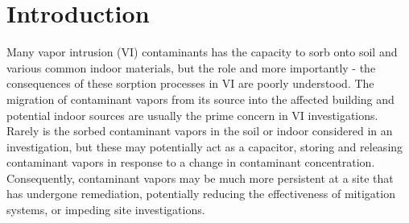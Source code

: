 \begin{comment}

What is the message of the paper?

Sorbed contaminants can significantly delay changes in concentration in the indoor air and the soil-gas depending on the particular soil and/or indoor materials found.
This has consequences if one is for instance interested in mitigating or remediating a VI site as sorption may significantly impede this effort.
It also has consequences for rooting out indoor contaminant sources as:
1. Even after ventilation and/or removing potential indoor sources, there may still be contaminant vapors being released from various materials.
2. It may decrease the effectiveness of applying the CPM.

What is the new result/contribution that you want to describe?

This study presents some new sorption information for TCE and runs never-done-before simulations that investigate the potential role of sorption in VI and VI investigations.

What do you want to convince people of?

1. Take indoor materials into account and perhaps removing or covering up exposed materials that have a high sorption capacity.
2. Take it into consideration that contaminants vapors may emanate from soils for a long time, since they potentially have such a large sorption capacity - almost acting a source in of themselves. E.g. that remediation or mitigation effort may be impeded by this.
3. Perhaps desorbing soil/indoor material samples to determine how significant sorption might be warranted.

\end{comment}

\section{Introduction}\label{sec:intro}

Many vapor intrusion (VI) contaminants has the capacity to sorb onto soil and various common indoor materials, but the role and more importantly - the consequences of these sorption processes in VI are poorly understood.
The migration of contaminant vapors from its source into the affected building and potential indoor sources are usually the prime concern in VI investigations.
Rarely is the sorbed contaminant vapors in the soil or indoor considered in an investigation, but these may potentially act as a capacitor, storing and releasing contaminant vapors in response to a change in contaminant concentration.
Consequently, contaminant vapors may be much more persistent at a site that has undergone remediation, potentially reducing the effectiveness of mitigation systems, or impeding site investigations.\par

